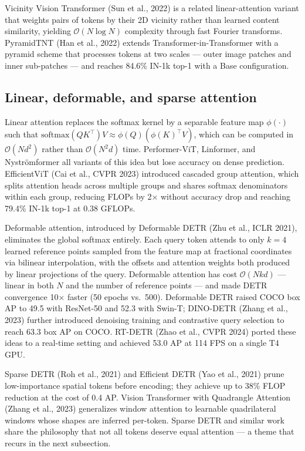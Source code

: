 Vicinity Vision Transformer (Sun et al., 2022) is a related linear-attention variant that weights pairs of tokens by their 2D vicinity rather than learned content similarity, yielding \(\mathcal{O}(N \log N)\) complexity through fast Fourier transforms. PyramidTNT (Han et al., 2022) extends Transformer-in-Transformer with a pyramid scheme that processes tokens at two scales --- outer image patches and inner sub-patches --- and reaches 84.6\% IN-1k top-1 with a Base configuration.

\subsection{Linear, deformable, and sparse attention}\label{linear-deformable-and-sparse-attention}

Linear attention replaces the softmax kernel by a separable feature map \(\phi(\cdot)\) such that \(\mathrm{softmax}(QK^\top)V \approx \phi(Q)(\phi(K)^\top V)\), which can be computed in \(\mathcal{O}(Nd^2)\) rather than \(\mathcal{O}(N^2 d)\) time. Performer-ViT, Linformer, and Nyströmformer all variants of this idea but lose accuracy on dense prediction. EfficientViT (Cai et al., CVPR 2023) introduced cascaded group attention, which splits attention heads across multiple groups and shares softmax denominators within each group, reducing FLOPs by 2× without accuracy drop and reaching 79.4\% IN-1k top-1 at 0.38 GFLOPs.

Deformable attention, introduced by Deformable DETR (Zhu et al., ICLR 2021), eliminates the global softmax entirely. Each query token attends to only \(k = 4\) learned reference points sampled from the feature map at fractional coordinates via bilinear interpolation, with the offsets and attention weights both produced by linear projections of the query. Deformable attention has cost \(\mathcal{O}(N k d)\) --- linear in both \(N\) and the number of reference points --- and made DETR convergence 10× faster (50 epochs vs.~500). Deformable DETR raised COCO box AP to 49.5 with ResNet-50 and 52.3 with Swin-T; DINO-DETR (Zhang et al., 2023) further introduced denoising training and contrastive query selection to reach 63.3 box AP on COCO. RT-DETR (Zhao et al., CVPR 2024) ported these ideas to a real-time setting and achieved 53.0 AP at 114 FPS on a single T4 GPU.

Sparse DETR (Roh et al., 2021) and Efficient DETR (Yao et al., 2021) prune low-importance spatial tokens before encoding; they achieve up to 38\% FLOP reduction at the cost of 0.4 AP. Vision Transformer with Quadrangle Attention (Zhang et al., 2023) generalizes window attention to learnable quadrilateral windows whose shapes are inferred per-token. Sparse DETR and similar work share the philosophy that not all tokens deserve equal attention --- a theme that recurs in the next subsection.

